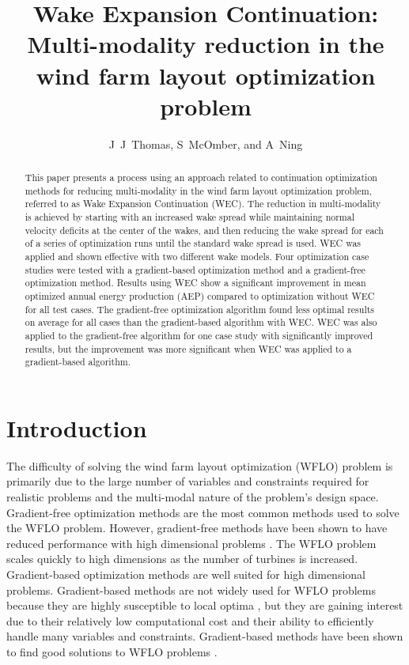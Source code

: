 \documentclass{jpconf}
\begin{document}
\title{Wake Expansion Continuation: \large{Multi-modality reduction in the wind farm layout optimization problem}}

\author{J~J~Thomas, S~McOmber, and A~Ning}
\address{Department of Mechanical Engineering,
Brigham Young University, Provo, Utah, USA}

\begin{abstract}
	This paper presents a process using an approach related to  continuation optimization methods for reducing multi-modality in the wind farm layout optimization problem, referred to as Wake Expansion Continuation (WEC). The reduction in multi-modality is achieved by starting with an increased wake spread while maintaining normal velocity deficits at the center of the wakes, and then reducing the wake spread for each of a series of optimization runs until the standard wake spread is used. WEC was applied and shown effective with two different wake models. Four optimization case studies were tested with a gradient-based optimization method and a gradient-free optimization method. Results using WEC show a significant improvement in mean optimized annual energy production (AEP) compared to optimization without WEC for all test cases. The gradient-free optimization algorithm found less optimal results on average for all cases than the gradient-based algorithm with WEC. WEC was also applied to the gradient-free algorithm for one case study with significantly improved results, but the improvement was more significant when WEC was applied to a gradient-based algorithm.
\end{abstract}

\section{Introduction}

The difficulty of solving the wind farm layout optimization (WFLO) problem is primarily due to the large number of variables and constraints required for realistic problems and the multi-modal nature of the problem's design space. Gradient-free optimization methods are the most common methods used to solve the WFLO problem. However, gradient-free methods have been shown to have reduced performance with high dimensional problems \cite{rios2013-grad-free-comparison}. The WFLO problem scales quickly to high dimensions as the number of turbines is increased. Gradient-based optimization methods are well suited for high dimensional problems. Gradient-based methods are not widely used for WFLO problems because they are highly susceptible to local optima \cite{acero2014}, but they are gaining interest due to their relatively low computational cost and their ability to efficiently handle many variables and constraints. Gradient-based methods have been shown to find good solutions to WFLO problems \cite{fleming2015, guirguis2016, gebraad2017-Maximization-Annual}.  
\end{document}
